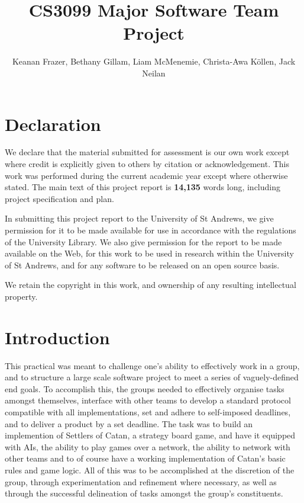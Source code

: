 \documentclass[a4paper,doc]{apa6}
\title{CS3099 Major Software Team Project}
\author{Keanan Frazer, Bethany Gillam, Liam McMenemie, Christa-Awa Köllen, Jack Neilan}
\affiliation{University of St Andrews}
\begin{document}
\maketitle




\section{Declaration}
We declare that the material submitted for assessment is our own work except where credit is explicitly given to others by citation or acknowledgement. This work was performed during the current academic year except where otherwise stated. The main text of this project report is \textbf{14,135} words long, including project specification and plan.

In submitting this project report to the University of St Andrews, we give permission for it to be made available for use in accordance with the regulations of the University Library. We also give permission for the report to be made available on the Web, for this work to be used in research within the University of St Andrews, and for any software to be released on an open source basis.

We retain the copyright in this work, and ownership of any resulting intellectual property.



\newpage
\tableofcontents
\newpage



\section{Introduction}
This practical was meant to challenge one’s ability to effectively work in a group, and to structure a large scale software project to meet a series of vaguely-defined end goals. To accomplish this, the groups needed to effectively organise tasks amongst themselves, interface with other teams to develop a standard protocol compatible with all implementations, set and adhere to self-imposed deadlines, and to deliver a product by a set deadline. The task was to build an implemention of Settlers of Catan, a strategy board game, and have it equipped with AIs, the ability to play games over a network, the ability to network with other teams and to of course have a working implementation of Catan’s basic rules and game logic. All of this was to be accomplished at the discretion of the group, through experimentation and refinement where necessary, as well as through the successful delineation of tasks amongst the group’s constituents.
\end{document}

